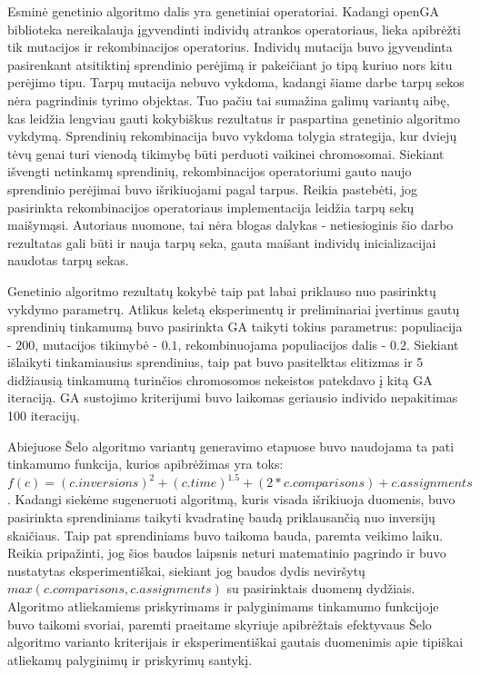 \documentclass{VUMIFInfKursinis}
\begin{document}
Esminė genetinio algoritmo dalis yra genetiniai operatoriai.
Kadangi openGA biblioteka nereikalauja įgyvendinti individų atrankos operatoriaus, lieka apibrėžti tik mutacijos ir rekombinacijos operatorius.
Individų mutacija buvo įgyvendinta pasirenkant atsitiktinį sprendinio perėjimą ir pakeičiant jo tipą kuriuo nors kitu perėjimo tipu.
Tarpų mutacija nebuvo vykdoma, kadangi šiame darbe tarpų sekos nėra pagrindinis tyrimo objektas.
Tuo pačiu tai sumažina galimų variantų aibę, kas leidžia lengviau gauti kokybiškus rezultatus ir paspartina genetinio algoritmo vykdymą.
Sprendinių rekombinacija buvo vykdoma tolygia strategija, kur dviejų tėvų genai turi vienodą tikimybę
būti perduoti vaikinei chromosomai.
Siekiant išvengti netinkamų sprendinių, rekombinacijos operatoriumi gauto naujo sprendinio perėjimai buvo išrikiuojami pagal tarpus.
Reikia pastebėti, jog pasirinkta rekombinacijos operatoriaus implementacija leidžia tarpų sekų maišymąsi.
Autoriaus nuomone, tai nėra blogas dalykas - netiesioginis šio darbo rezultatas gali būti ir nauja tarpų seka, gauta maišant
individų inicializacijai naudotas tarpų sekas.

Genetinio algoritmo rezultatų kokybė taip pat labai priklauso nuo pasirinktų vykdymo parametrų.
Atlikus keletą eksperimentų ir preliminariai įvertinus gautų sprendinių tinkamumą buvo pasirinkta GA taikyti tokius parametrus:
populiacija - $200$, mutacijos tikimybė - $0.1$, rekombinuojama populiacijos dalis - $0.2$.
Siekiant išlaikyti tinkamiausius sprendinius, taip pat buvo pasitelktas elitizmas ir 5 didžiausią tinkamumą turinčios chromosomos nekeistos patekdavo į kitą GA iteraciją.
GA sustojimo kriterijumi buvo laikomas geriausio individo nepakitimas 100 iteracijų.

Abiejuose Šelo algoritmo variantų generavimo etapuose buvo naudojama ta pati tinkamumo funkcija, kurios apibrėžimas yra toks:
\\${f(c) = (c.inversions)^2 + (c.time)^{1.5} + (2*c.comparisons) + c.assignments}$.
Kadangi siekėme sugeneruoti algoritmą, kuris visada išrikiuoja duomenis, buvo pasirinkta sprendiniams taikyti kvadratinę baudą priklausančią nuo inversijų skaičiaus.
Taip pat sprendiniams buvo taikoma bauda, paremta veikimo laiku. Reikia pripažinti, jog šios baudos laipsnis neturi matematinio pagrindo ir buvo nustatytas eksperimentiškai,
siekiant jog baudos dydis neviršytų ${max(c.comparisons, c.assignments)}$ su pasirinktais duomenų dydžiais.
Algoritmo atliekamiems priskyrimams ir palyginimams tinkamumo funkcijoje buvo taikomi svoriai, paremti
praeitame skyriuje apibrėžtais efektyvaus Šelo algoritmo varianto kriterijais ir eksperimentiškai gautais duomenimis apie tipiškai atliekamų palyginimų ir priskyrimų santykį.
\end{document}
